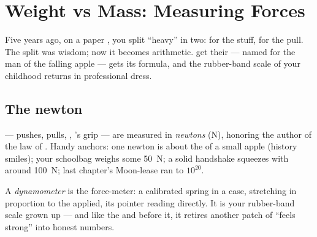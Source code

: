 \chapter{Weight vs Mass: Measuring Forces}\label{ch:g9:weight-vs-mass}

Five years ago, on a paper , you split ``heavy'' in two:
 for the stuff,  for the pull. The split was
wisdom; now it becomes arithmetic.  get their  ---
named for the man of the falling apple ---  gets its
formula, and the rubber-band scale of your childhood returns
in professional dress.

\section{The newton}

\begin{definition}\label{def:g9:weight-vs-mass:newton}
 --- pushes, pulls, , 's grip --- are
measured in \emph{newtons} (\unit{N}), honoring
the author of the law of . Handy anchors: one
newton is about the  of a small apple (history smiles);
your schoolbag weighs some \qty{50}{N}; a solid handshake
squeezes with around \qty{100}{N}; last chapter's Moon-lease
ran to $10^{20}$.
\end{definition}

\begin{definition}[Dynamometer]\label{def:g9:weight-vs-mass:dynamometer}
A \emph{dynamometer} is the force-meter: a
calibrated spring in a case, stretching in proportion to the
 applied, its pointer reading  directly. It is
your rubber-band scale grown up --- and like the 
and  before it, it retires another patch of ``feels
strong'' into honest numbers.
\end{definition}

